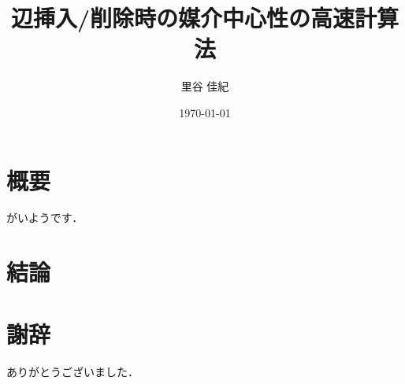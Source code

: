 \documentclass{jreport}
\title{辺挿入/削除時の媒介中心性の高速計算法}
\author{里谷 佳紀}
\date{\today}
\begin{document}
\maketitle

\chapter*{概要}
がいようです．

\tableofcontents



%
%
%

\chapter{結論}

\chapter*{謝辞}
ありがとうございました．

\appendix

\printbibliography[title=参考文献]
\end{document}
